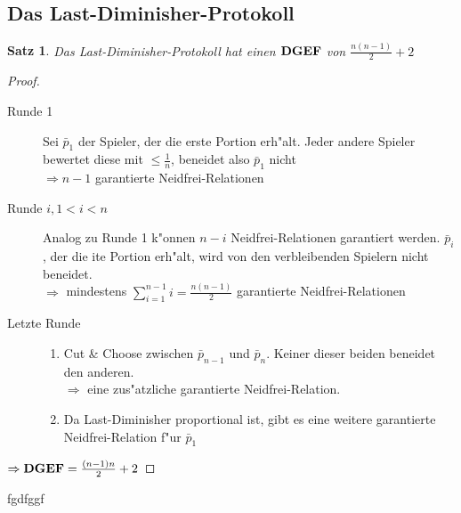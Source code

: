 \documentclass[11pt, a4paper, twoside]{article}
\newcommand{\wf}{\color{white}}
\newcommand{\tf}{\color{black}}
\newtheorem*{satz}{Satz}
\newcommand{\DGEF}{\text{\textbf{DGEF}}}
\numberwithin{equation}{section}
\begin{document}
\subsection{Das Last-Diminisher-Protokoll}
%
\begin{satz}
 Das Last-Diminisher-Protokoll hat einen $\DGEF$ von $\frac{n(n-1)}{2}+2$
\end{satz}
\begin{proof}
 \begin{description}
  \item[Runde 1] Sei $\bar{p}_1$ der Spieler, der die erste Portion erh"alt. Jeder andere Spieler bewertet diese mit $\leq\frac{1}{n}$,
                 beneidet also $\bar{p}_1$ nicht\\$\Rightarrow n-1$ garantierte Neidfrei-Relationen
  \item[Runde $i, 1<i<n$] Analog zu Runde 1 k"onnen $n-i$ Neidfrei-Relationen garantiert werden. $\bar{p}_i$, der die ite Portion erh"alt, wird
                          von den verbleibenden Spielern nicht beneidet.\\$\Rightarrow$ mindestens $\sum\limits_{i=1}^{n-1}i=\frac{n(n-1)}{2}$
                          garantierte Neidfrei-Relationen
  \item[Letzte Runde] \begin{enumerate}
                       \item Cut \& Choose zwischen $\bar{p}_{n-1}$ und $\bar{p}_n$. Keiner dieser beiden beneidet den anderen.\\
                             $\Rightarrow$ eine zus"atzliche garantierte Neidfrei-Relation.
                       \item Da Last-Diminisher proportional ist, gibt es eine weitere garantierte Neidfrei-Relation f"ur $\bar{p}_1$
                      \end{enumerate}
 \end{description}
$\Rightarrow\DGEF=\frac{(n-1)n}{2}+2$ 
\end{proof}
\wf fgdfggf\\ \tf
\end{document}
